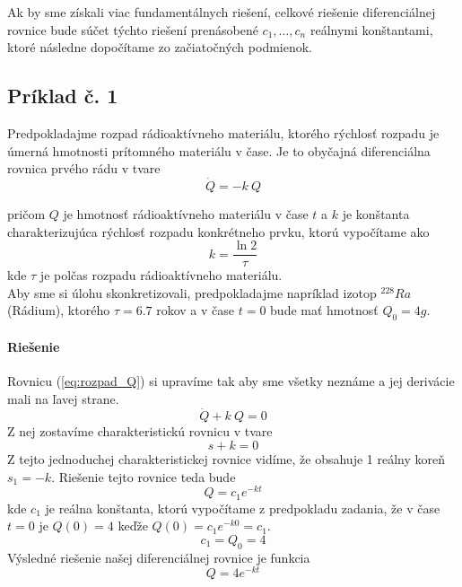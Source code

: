 \documentclass[a4paper, 10pt, ]{article}
\begin{document}
Ak by sme získali viac fundamentálnych riešení, celkové riešenie diferenciálnej rovnice bude súčet týchto riešení prenásobené $c_{1}, \dots, c_{n}$ reálnymi konštantami, ktoré následne dopočítame zo začiatočných podmienok.





\subsection{Príklad č. 1}

Predpokladajme rozpad rádioaktívneho materiálu, ktorého rýchlosť rozpadu je úmerná hmotnosti prítomného materiálu v čase. Je to obyčajná diferenciálna rovnica prvého rádu v tvare
\begin{equation}\label{eq:rozpad_Q}
    \Dot{Q} = -k \  Q
\end{equation}

pričom $Q$ je hmotnosť rádioaktívneho materiálu v čase $t$ a $k$ je konštanta charakterizujúca rýchlosť rozpadu konkrétneho prvku, ktorú vypočítame ako
\begin{equation}
    k = \frac{\ln{2}}{\tau}
\end{equation}
kde $\tau$ je polčas rozpadu rádioaktívneho materiálu.\\

Aby sme si úlohu skonkretizovali, predpokladajme napríklad izotop $^{228}Ra$ (Rádium), ktorého $\tau = 6.7$ rokov a v čase $t=0$ bude mať hmotnosť $Q_{0} = 4 g$. 


\paragraph{Riešenie}

Rovnicu (\ref{eq:rozpad_Q}) si upravíme tak aby sme všetky neznáme a jej derivácie mali na ľavej strane. 
\begin{equation}\label{eq:rozpad_Q2}
    \Dot{Q} + k \  Q = 0
\end{equation}
Z nej zostavíme charakteristickú rovnicu v tvare
\begin{equation}
    s + k = 0
\end{equation}
Z tejto jednoduchej charakteristickej rovnice vidíme, že obsahuje 1 reálny koreň $s_1 = -k$. Riešenie tejto rovnice teda bude
\begin{equation}
    Q = c_1 e^{-kt}
\end{equation}
kde $c_1$ je reálna konštanta, ktorú vypočítame z predpokladu zadania, že v čase $t = 0$ je $Q(0) = 4$ keďže $Q(0) = c_1 e^{-k 0} = c_1$.
\begin{equation}
    c_{1} = Q_{0} = 4
\end{equation}
Výsledné riešenie našej diferenciálnej rovnice je funkcia
\begin{equation}
    Q = 4 e^{-kt}
\end{equation}
\end{document}
